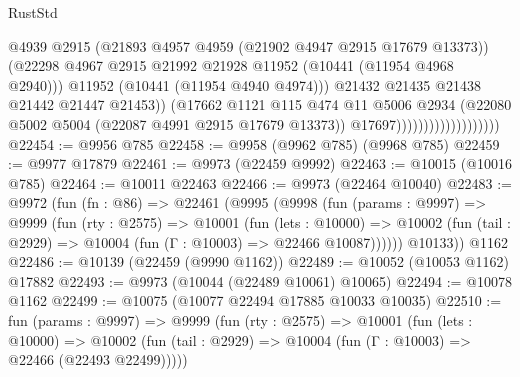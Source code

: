 \begin{lexlean}{RustStd}
\begin{coremodule}
                                              @4939
                                              @2915
                                              (@21893
                                                @4957
                                                @4959
                                                (@21902 @4947 @2915 @17679 @13373))
                                              (@22298
                                                @4967
                                                @2915
                                                @21992
                                                @21928
                                                @11952
                                                (@10441 (@11954 @4968 @2940)))
                                              @11952
                                              (@10441 (@11954 @4940 @4974)))
                                            @21432
                                            @21435
                                            @21438
                                            @21442
                                            @21447
                                            @21453))
                                        (@17662
                                          @1121
                                          @115
                                          @474
                                          @11
                                          @5006
                                          @2934
                                          (@22080 @5002 @5004 (@22087 @4991 @2915 @17679 @13373))
                                          @17697)))))))))))))))))))
@22454 := @9956 @785
@22458 := @9958 (@9962 @785) (@9968 @785)
@22459 := @9977 @17879
@22461 := @9973 (@22459 @9992)
@22463 := @10015 (@10016 @785)
@22464 := @10011 @22463
@22466 := @9973 (@22464 @10040)
@22483 := @9972
    (fun (fn : @86) =>
    @22461
      (@9995
        (@9998
          (fun (params : @9997) =>
          @9999
            (fun (rty : @2575) =>
            @10001
              (fun (lets : @10000) =>
              @10002 (fun (tail : @2929) => @10004 (fun (Γ : @10003) => @22466 @10087))))))
        @10133))
    @1162
@22486 := @10139 (@22459 (@9990 @1162))
@22489 := @10052 (@10053 @1162) @17882
@22493 := @9973 (@10044 (@22489 @10061) @10065)
@22494 := @10078 @1162
@22499 := @10075 (@10077 @22494 @17885 @10033 @10035)
@22510 := fun (params : @9997) =>
  @9999
    (fun (rty : @2575) =>
    @10001
      (fun (lets : @10000) =>
      @10002 (fun (tail : @2929) => @10004 (fun (Γ : @10003) => @22466 (@22493 @22499)))))

\end{coremodule}
\end{lexlean}
